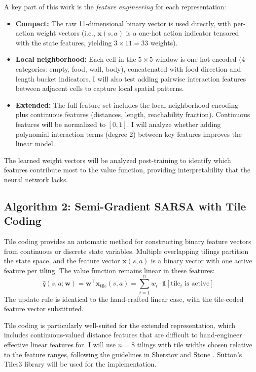 \documentclass[11pt]{article}
\begin{document}
A key part of this work is the \emph{feature engineering} for each representation:
\begin{itemize}[nosep]
    \item \textbf{Compact:} The raw 11-dimensional binary vector is used directly, with per-action weight vectors (i.e., $\mathbf{x}(s,a)$ is a one-hot action indicator tensored with the state features, yielding $3 \times 11 = 33$ weights).
    \item \textbf{Local neighborhood:} Each cell in the $5 \times 5$ window is one-hot encoded (4 categories: empty, food, wall, body), concatenated with food direction and length bucket indicators. I will also test adding pairwise interaction features between adjacent cells to capture local spatial patterns.
    \item \textbf{Extended:} The full feature set includes the local neighborhood encoding plus continuous features (distances, length, reachability fraction). Continuous features will be normalized to $[0, 1]$. I will analyze whether adding polynomial interaction terms (degree 2) between key features improves the linear model.
\end{itemize}

The learned weight vectors will be analyzed post-training to identify which features contribute most to the value function, providing interpretability that the neural network lacks.

\subsection{Algorithm 2: Semi-Gradient SARSA with Tile Coding}

Tile coding \citep{sutton2018reinforcement, sherstov2005tilecoding} provides an automatic method for constructing binary feature vectors from continuous or discrete state variables. Multiple overlapping tilings partition the state space, and the feature vector $\mathbf{x}(s,a)$ is a binary vector with one active feature per tiling. The value function remains linear in these features:
\begin{equation}
    \hat{q}(s, a; \mathbf{w}) = \mathbf{w}^\top \mathbf{x}_{\text{tile}}(s, a) = \sum_{i=1}^{n} w_i \cdot \mathbb{1}[\text{tile}_i \text{ is active}]
\end{equation}
The update rule is identical to the hand-crafted linear case, with the tile-coded feature vector substituted.

Tile coding is particularly well-suited for the extended representation, which includes continuous-valued distance features that are difficult to hand-engineer effective linear features for. I will use $n = 8$ tilings with tile widths chosen relative to the feature ranges, following the guidelines in Sherstov and Stone \citep{sherstov2005tilecoding}. Sutton's Tiles3 library will be used for the implementation.
\end{document}
